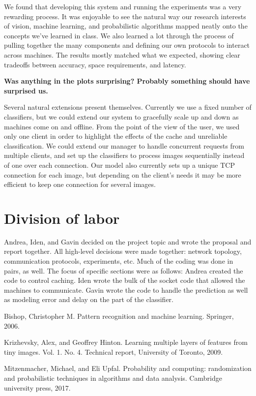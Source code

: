 \documentclass[11pt]{article}
\begin{document}
We found that developing this system and running the experiments was a very rewarding process.
It was enjoyable to see the natural way our research interests of vision, machine learning, and probabilistic algorithms mapped neatly onto the concepts we've learned in class.
We also learned a lot through the process of pulling together the many components and defining our own protocols to interact across machines.
The results mostly matched what we expected, showing clear tradeoffs between accuracy, space requirements, and latency.

{\bf Was anything in the plots surprising?
Probably something should have surprised us.}

Several natural extensions present themselves.
Currently we use a fixed number of classifiers, but we could extend our system to gracefully scale up and down as machines come on and offline.
From the point of the view of the user, we used only one client in order to highlight the effects of the cache and unreliable classification.
We could extend our manager to handle concurrent requests from multiple clients, and set up the classifiers to process images sequentially instead of one over each connection.
Our model also currently sets up a unique TCP connection for each image, but depending on the client's needs it may be more efficient to keep one connection for several images.

\section{Division of labor}

Andrea, Iden, and Gavin decided on the project topic and wrote the proposal and report together.
All high-level decisions were made together: network topology, communication protocols, experiments, etc.
Much of the coding was done in pairs, as well.
The focus of specific sections were as follows: Andrea created the code to control caching.
Iden wrote the bulk of the socket code that allowed the machines to communicate.
Gavin wrote the code to handle the prediction as well as modeling error and delay on the part of the classifier.


\footnotesize\begin{thebibliography}{1}
    Bishop, Christopher M. Pattern recognition and machine learning. Springer, 2006.

    Krizhevsky, Alex, and Geoffrey Hinton. Learning multiple layers of features from tiny images. Vol. 1. No. 4. Technical report, University of Toronto, 2009.

    Mitzenmacher, Michael, and Eli Upfal. Probability and computing: randomization and probabilistic techniques in algorithms and data analysis. Cambridge university press, 2017.

\end{thebibliography}
\end{document}
